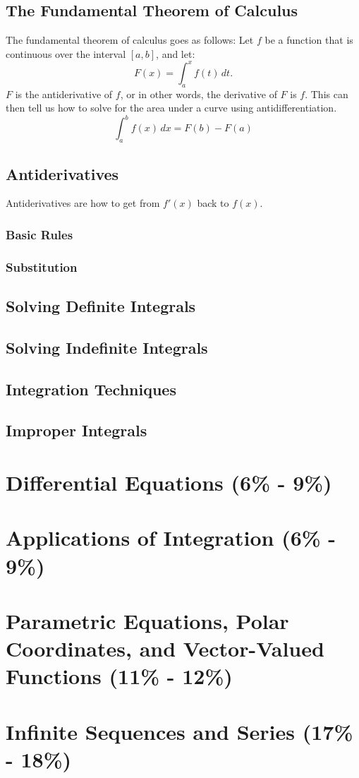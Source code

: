 \documentclass[12pt]{article}
\begin{document}
        \subsection{The Fundamental Theorem of Calculus}
            The fundamental theorem of calculus goes as follows:
            \newline \newline
            Let $f$ be a function that is continuous over the interval $[a, b]$, and let:
            \[ F(x) = \int_{a}^{x} f(t) \, dt. \]
            $F$ is the antiderivative of $f$, or in other words, the derivative of $F$ is $f$. This can then tell us how to solve for the area under a curve using antidifferentiation.
            \[ \int_{a}^{b} f(x) \, dx = F(b) - F(a) \]

        \subsection{Antiderivatives}
            Antiderivatives are how to get from $f'(x)$ back to $f(x)$.
            \subsubsection{Basic Rules}

            \subsubsection{Substitution}

        \subsection{Solving Definite Integrals}

        \subsection{Solving Indefinite Integrals}


        \subsection{Integration Techniques}

        \subsection{Improper Integrals}

    \section{Differential Equations (6\% - 9\%)}

    \section{Applications of Integration (6\% - 9\%)}

    \section{Parametric Equations, Polar Coordinates, and Vector-Valued Functions (11\% - 12\%)}

    \section{Infinite Sequences and Series (17\% - 18\%)}
\end{document}
